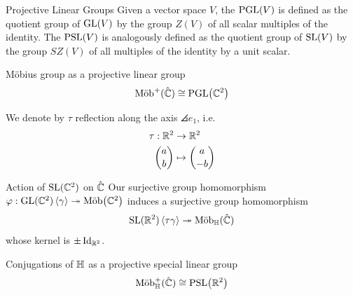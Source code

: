 \begin{importantdefinition}{Projective Linear Groups}{}
	Given a vector space $V$, the  $\tn{PGL}(V)$ is defined as the quotient group of $\GL(V)$ by the group $Z(V)$ of all scalar multiples of the identity. The  $\tn{PSL}(V)$ is analogously defined as the quotient group of $\SL(V)$ by the group $SZ(V)$ of all multiples of the identity by a unit scalar.
\end{importantdefinition}
\begin{importanttheorem}{Möbius group as a projective linear group}{}
	\begin{align*}
		\tn{Möb}^+(\hat \bC) \cong \PGL\lr(\bC^2)
	\end{align*}
\end{importanttheorem}
\begin{definition}
	We denote by $\tau$ reflection along the  axis $\angles{e_1}$, i.e.
	\begin{align*}
		\tau : \bR^2 &\to \bR^2\\
		\binom{a}{b} &\mapsto \binom{a}{-b}
	\end{align*}
\end{definition}
\begin{importanttheorem}{Action of $\SL(\bC^2)$ on $\hat \bC$}{}
	Our surjective group homomorphism $\phi : \GL(\bC^2)\angles{\gamma} \surj \Moeb\lr(\bC^2)$ induces a surjective group homomorphism
	\begin{align*}
		\SL(\bR^2)\angles{\tau \gamma} \surj \Moeb_\bH(\hat \bC)
	\end{align*}
	whose kernel is $\pm \Id_{\bR^2}$.
\end{importanttheorem}
\begin{importanttheorem}{Conjugations of $\bH$ as a projective special linear group}{}
	\begin{align*}
		\tn{Möb}^+_\bH(\hat \bC) \cong \PSL\lr(\bR^2)
	\end{align*}
\end{importanttheorem}